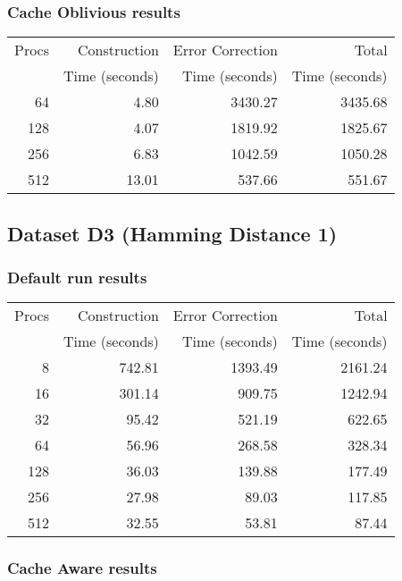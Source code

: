 \documentclass[integrals, nointegrals, article, 12pt, a4paper]{article}
\begin{document}
\subsubsection{Cache Oblivious results}
\label{sec-2-3-3}

\begin{center}
\begin{tabular}{rrrr}
\hline
Procs & Construction & Error Correction & Total\\
 & Time (seconds) & Time (seconds) & Time (seconds)\\
\hline
64 & 4.80 & 3430.27 & 3435.68\\
128 & 4.07 & 1819.92 & 1825.67\\
256 & 6.83 & 1042.59 & 1050.28\\
512 & 13.01 & 537.66 & 551.67\\
\hline
\end{tabular}
\end{center}
\subsection{Dataset D3 (Hamming Distance 1)}
\label{sec-2-4}
\subsubsection{Default run results}
\label{sec-2-4-1}

\begin{center}
\begin{tabular}{rrrr}
\hline
Procs & Construction & Error Correction & Total\\
 & Time (seconds) & Time (seconds) & Time (seconds)\\
\hline
8 & 742.81 & 1393.49 & 2161.24\\
16 & 301.14 & 909.75 & 1242.94\\
32 & 95.42 & 521.19 & 622.65\\
64 & 56.96 & 268.58 & 328.34\\
128 & 36.03 & 139.88 & 177.49\\
256 & 27.98 & 89.03 & 117.85\\
512 & 32.55 & 53.81 & 87.44\\
\hline
\end{tabular}
\end{center}
\subsubsection{Cache Aware results}
\label{sec-2-4-2}
\end{document}
